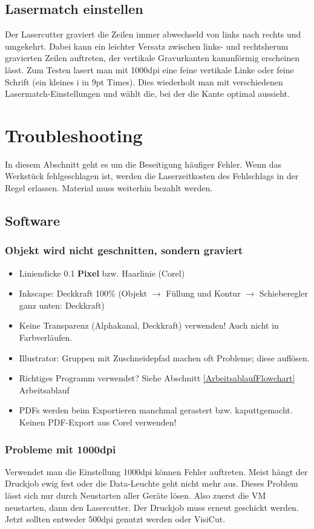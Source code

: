 \documentclass{\basedir/fablab-document}
\newcommand{\todo}[1]{\textbf{\color{red}{TODO: #1}}}
\begin{document}
\subsection{Lasermatch einstellen}
Der Lasercutter graviert die Zeilen immer abwechseld von links nach rechts und umgekehrt. Dabei kann ein leichter Versatz zwischen links- und rechtsherum gravierten Zeilen auftreten, der vertikale Gravurkanten kammförmig erscheinen lässt. Zum Testen lasert man mit 1000dpi eine feine vertikale Linke oder feine Schrift (ein kleines i in 9pt Times). Dies wiederholt man mit verschiedenen Lasermatch-Einstellungen und wählt die, bei der die Kante optimal aussieht.

\todo{aus Aufzeichnungen übertragen}

\section{Troubleshooting}
In diesem Abschnitt geht es um die Beseitigung häufiger Fehler. Wenn das Werkstück fehlgeschlagen ist, werden die Laserzeitkosten des Fehlschlags in der Regel erlassen. Material muss weiterhin bezahlt werden.

\subsection{Software}
\subsubsection{Objekt wird nicht geschnitten, sondern graviert}
\begin{itemize}
 \item Liniendicke 0.1 \textbf{Pixel} bzw. Haarlinie (Corel)
 \item Inkscape: Deckkraft 100\% (Objekt $\rightarrow$ Füllung und Kontur $\rightarrow$ Schieberegler ganz unten: Deckkraft)
 \item Keine Transparenz (Alphakanal, Deckkraft) verwenden! Auch nicht in Farbverläufen.
 \item Illustrator: Gruppen mit Zuschneidepfad machen oft Probleme; diese auflösen.
 \item Richtiges Programm verwendet? Siehe Abschnitt \ref{ArbeitsablaufFlowchart} Arbeitsablauf
 \item PDFs werden beim Exportieren manchmal gerastert bzw. kaputtgemacht. Keinen PDF-Export aus Corel verwenden!
\end{itemize}


\subsubsection{Probleme mit 1000dpi}
Verwendet man die Einstellung 1000dpi können Fehler auftreten. Meist hängt der Druckjob ewig fest oder die Data-Leuchte geht nicht mehr aus. Dieses Problem lässt sich nur durch Neustarten aller Geräte lösen. Also zuerst die VM neustarten, dann den Lasercutter. Der Druckjob muss erneut geschickt werden. Jetzt sollten entweder 500dpi genutzt werden oder VisiCut.
\end{document}
